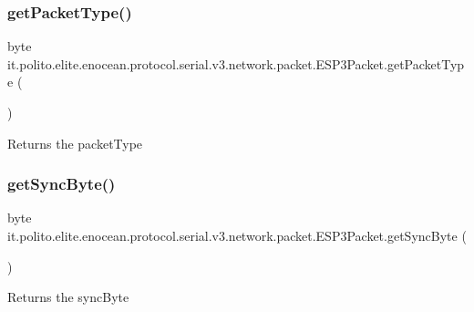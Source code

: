 \subsubsection{\texorpdfstring{get\+Packet\+Type()}{getPacketType()}}
{\footnotesize\ttfamily byte it.\+polito.\+elite.\+enocean.\+protocol.\+serial.\+v3.\+network.\+packet.\+E\+S\+P3\+Packet.\+get\+Packet\+Type (\begin{DoxyParamCaption}{ }\end{DoxyParamCaption})}

\begin{DoxyReturn}{Returns}
the packet\+Type 
\end{DoxyReturn}
\hypertarget{classit_1_1polito_1_1elite_1_1enocean_1_1protocol_1_1serial_1_1v3_1_1network_1_1packet_1_1_e_s_p3_packet_a69a77d579f8918f22a266ff31882d113}{}\label{classit_1_1polito_1_1elite_1_1enocean_1_1protocol_1_1serial_1_1v3_1_1network_1_1packet_1_1_e_s_p3_packet_a69a77d579f8918f22a266ff31882d113} 
\subsubsection{\texorpdfstring{get\+Sync\+Byte()}{getSyncByte()}}
{\footnotesize\ttfamily byte it.\+polito.\+elite.\+enocean.\+protocol.\+serial.\+v3.\+network.\+packet.\+E\+S\+P3\+Packet.\+get\+Sync\+Byte (\begin{DoxyParamCaption}{ }\end{DoxyParamCaption})}

\begin{DoxyReturn}{Returns}
the sync\+Byte 
\end{DoxyReturn}
\hypertarget{classit_1_1polito_1_1elite_1_1enocean_1_1protocol_1_1serial_1_1v3_1_1network_1_1packet_1_1_e_s_p3_packet_a5251eff8c27403c2e45b52e381194d77}{}\label{classit_1_1polito_1_1elite_1_1enocean_1_1protocol_1_1serial_1_1v3_1_1network_1_1packet_1_1_e_s_p3_packet_a5251eff8c27403c2e45b52e381194d77} 
